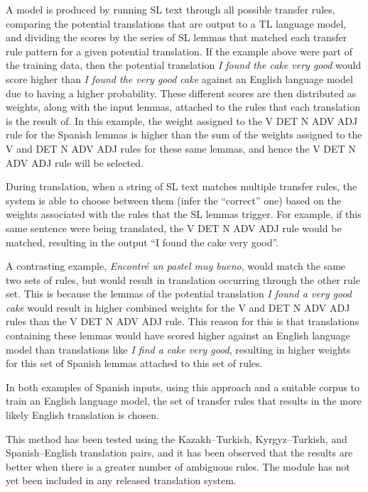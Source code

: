 \documentclass[free]{flammie}
\begin{document}
A model is produced by running SL text through all possible transfer rules,
comparing the potential translations that are output to a TL language model, and
dividing the scores by the series of SL lemmas that matched each transfer rule
pattern for a given potential translation.  If the example above were part of
the training data, then the potential translation \emph{I found the cake very
good} would score higher than \emph{I found the very good cake} against an
English language model due to having a higher probability.  These different
scores are then distributed as weights, along with the input lemmas, attached to
the rules that each translation is the result of.  In this example, the weight
assigned to the V DET N ADV ADJ rule for the Spanish lemmas is higher than the
sum of the weights assigned to the V and DET N ADV ADJ rules for these same
lemmas, and hence the V DET N ADV ADJ rule will be selected.

During translation, when a string of SL text matches multiple transfer rules,
the system is able to choose between them (infer the ``correct'' one) based on
the weights associated with the rules that the SL lemmas trigger.  For example,
if this same sentence were being translated, the V DET N ADV ADJ rule would be
matched, resulting in the output ``I found the cake very good''.

A contrasting example, \emph{Encontré un pastel muy bueno}, would match the same
two sets of rules, but would result in translation occurring through the other
rule set.  This is because the lemmas of the potential translation \emph{I found
a very good cake} would result in higher combined weights for the V and DET N
ADV ADJ rules than the V DET N ADV ADJ rule.  This reason for this is that
translations containing these lemmas would have scored higher against an English
language model than translations like \emph{I find a cake very good}, resulting
in higher weights for this set of Spanish lemmas attached to this set of rules.

In both examples of Spanish inputs, using this approach and a suitable corpus to
train an English language model, the set of transfer rules that results in the
more likely English translation is chosen.

This method has been tested using the Kazakh--Turkish, Kyrgyz--Turkish, and
Spanish--English translation pairs, and it has been observed that the results
are better when there is a greater number of ambiguous rules.  The module has
not yet been included in any released translation system.
\end{document}
